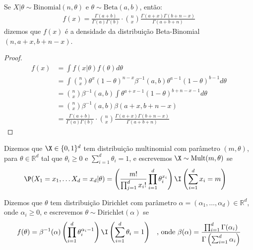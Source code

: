 \begin{lemma}
 Se $X|\theta \sim \text{Binomial}(n,\theta)$ e
 $\theta \sim \text{Beta}(a,b)$, então:
 \begin{align*}
  f(x) =\frac{\Gamma(a+b)}{\Gamma(a)\Gamma(b)}
  \cdot {n \choose x} \frac{\Gamma(a+x)\Gamma(b+n-x)}
  {\Gamma(a+b+n)}
 \end{align*}
 dizemos que $f(x)$ é a densidade da 
 distribuição Beta-Binomial$(n,a+x,b+n-x)$.
\end{lemma}

\begin{proof}
 \begin{align*}
  f(x)	&= \int{f(x|\theta)f(\theta)d\theta} \\
  &= \int{{n \choose x}\theta^{x}(1-\theta)^{n-x}\beta^{-1}(a,b)\theta^{a-1}(1-\theta)^{b-1}d\theta} \\
  &= {n \choose x}\beta^{-1}(a,b)
  \int{\theta^{a+x-1}(1-\theta)^{b+n-x-1}d\theta} \\
  &= {n \choose x} \beta^{-1}(a,b) \beta(a+x,b+n-x) \\
  &= \frac{\Gamma(a+b)}{\Gamma(a)\Gamma(b)}
  \cdot {n \choose x}\frac{\Gamma(a+x)\Gamma(b+n-x)}
  {\Gamma(a+b+n)}
 \end{align*}
\end{proof}

\begin{definition}
 \label{def:multinomial}
 Dizemos que $\X \in \{0,1\}^d$ tem
 distribuição multinomial com
 parâmetro $(m,\theta)$, para
 $\theta \in \mathbb{R}^d$ tal que
 $\theta_i \geq 0$ e 
 $\sum_{i=1}^{d}\theta_i = 1$, e
 escrevemos $\X \sim \text{Mult}(m,\theta)$ se
 \begin{align*}
  \P(X_1 = x_1, \ldots X_d = x_d|\theta)
  &= \left(\frac{m!}
  {\prod_{j=1}^d x_i!}\prod_{i=1}^d\theta_i^{x_i}\right)
  \I\left(\sum_{i=1}^d x_i = m\right)
 \end{align*}
\end{definition}

\begin{definition}
 \label{def:dirichlet}
 Dizemos que $\theta$ tem
 distribuição Dirichlet com parâmetro
 $\alpha=(\alpha_1,\ldots,\alpha_d) \in \mathbb{R}^d$, onde
 $\alpha_i \geq 0$, e
 escrevemos 
 $\theta \sim \text{Dirichlet}(\alpha)$ se
 \begin{align*}
  f(\theta)
  &= \beta^{-1}(\alpha)
  \left(\prod_{i=1}^{d}\theta_i^{\alpha_i-1}\right)
  \I\left(\sum_{i=1}^d \theta_i = 1\right)
  & \text{, onde }
  \beta(\alpha) 
  = \frac{\prod_{i=1}^d \Gamma(\alpha_i)}
  {\Gamma\left(\sum_{i=1}^d \alpha_i\right)}
 \end{align*}
\end{definition}

